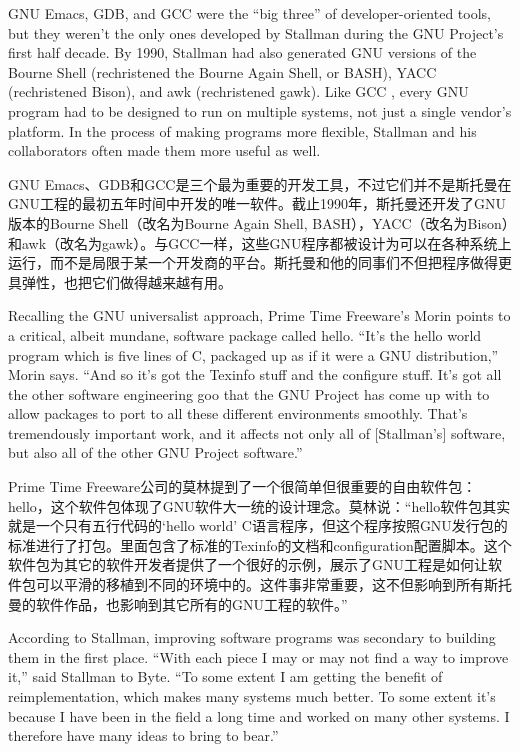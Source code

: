 \ifdefined\eng
GNU Emacs, GDB, and GCC were the ``big three'' of developer-oriented tools, but they weren't the only ones developed by Stallman during the GNU Project's first half decade. By 1990, Stallman had also generated GNU versions of the Bourne Shell (rechristened the Bourne Again Shell, or BASH), YACC (rechristened Bison), and awk (rechristened gawk). Like GCC , every GNU program had to be designed to run on multiple systems, not just a single vendor's platform. In the process of making programs more flexible, Stallman and his collaborators often made them more useful as well.
\fi

\ifdefined\chs
GNU Emacs、GDB和GCC是三个最为重要的开发工具，不过它们并不是斯托曼在GNU工程的最初五年时间中开发的唯一软件。截止1990年，斯托曼还开发了GNU版本的Bourne Shell（改名为Bourne Again Shell, BASH），YACC（改名为Bison）和awk（改名为gawk）。与GCC一样，这些GNU程序都被设计为可以在各种系统上运行，而不是局限于某一个开发商的平台。斯托曼和他的同事们不但把程序做得更具弹性，也把它们做得越来越有用。
\fi

\ifdefined\eng
Recalling the GNU universalist approach, Prime Time Freeware's Morin points to a critical, albeit mundane, software package called hello. ``It's the hello world program which is five lines of C, packaged up as if it were a GNU distribution,'' Morin says. ``And so it's got the Texinfo stuff and the configure stuff. It's got all the other software engineering goo that the GNU Project has come up with to allow packages to port to all these different environments smoothly. That's tremendously important work, and it affects not only all of [Stallman's] software, but also all of the other GNU Project software.''
\fi

\ifdefined\chs
Prime Time Freeware公司的莫林提到了一个很简单但很重要的自由软件包：hello，这个软件包体现了GNU软件大一统的设计理念。莫林说：``hello软件包其实就是一个只有五行代码的`hello world' C语言程序，但这个程序按照GNU发行包的标准进行了打包。里面包含了标准的Texinfo的文档和configuration配置脚本。这个软件包为其它的软件开发者提供了一个很好的示例，展示了GNU工程是如何让软件包可以平滑的移植到不同的环境中的。这件事非常重要，这不但影响到所有斯托曼的软件作品，也影响到其它所有的GNU工程的软件。''
\fi

\ifdefined\eng
According to Stallman, improving software programs was secondary to building them in the first place. ``With each piece I may or may not find a way to improve it,'' said Stallman to Byte. ``To some extent I am getting the benefit of reimplementation, which makes many systems much better. To some extent it's because I have been in the field a long time and worked on many other systems. I therefore have many ideas to bring to bear.''
\fi

